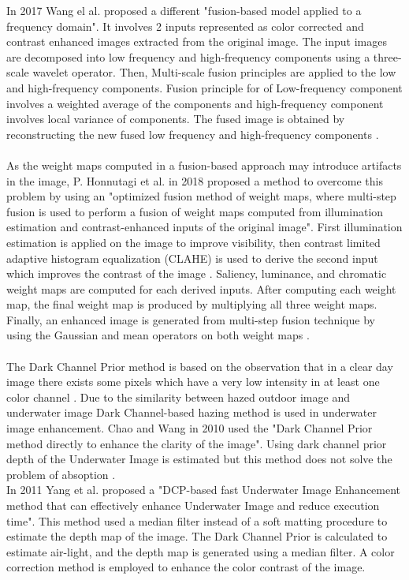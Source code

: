 \documentclass[a4paper,11pt,oneside]{article}
\begin{document}
  In 2017 Wang el al. \cite{12} proposed a different "fusion-based model applied to a frequency domain". It involves 2 inputs represented as color corrected and contrast enhanced images extracted from the original image. The input images are decomposed into low frequency and high-frequency components using a three-scale wavelet operator. Then, Multi-scale fusion principles are applied to the low and high-frequency components. Fusion principle for of Low-frequency component involves a weighted average of the components and high-frequency component involves local variance of components. The fused image is obtained by reconstructing the new fused low frequency and high-frequency components \cite{12}.\\
  \\
  As the weight maps computed in a fusion-based approach may introduce artifacts in the image, P. Honnutagi et al. in 2018 \cite{10} proposed a method to overcome this problem by using an "optimized fusion method of weight maps, where multi-step fusion is used to perform a fusion of weight maps computed from illumination estimation and contrast-enhanced inputs of the original image". First illumination estimation is applied on the image to improve visibility, then contrast limited adaptive histogram equalization (CLAHE) is used to derive the second input which improves the contrast of the image \cite{10}. Saliency, luminance, and chromatic weight maps are computed for each derived inputs. After computing each weight map, the final weight map is produced by multiplying all three weight maps. Finally, an enhanced image is generated from multi-step fusion technique by using the Gaussian and mean operators on both weight maps \cite{10}.\\
  \\
  The Dark Channel Prior method is based on the observation that in a clear day image there exists some pixels which have a very low intensity in at least one color channel \cite{15}. Due to the similarity between hazed outdoor image and underwater image Dark Channel-based hazing method is used in underwater image enhancement. Chao and Wang in 2010 \cite{25} used the "Dark Channel Prior method directly to enhance the clarity of the image". Using dark channel prior depth of the Underwater Image is estimated but this method does not solve the problem of absoption \cite{25}.\\
 In 2011 Yang et al. \cite{8} proposed a "DCP-based fast Underwater Image Enhancement method that can effectively enhance Underwater Image and reduce execution time". This method used a median filter instead of a soft matting procedure to estimate the depth map of the image. The Dark Channel Prior is calculated to estimate air-light, and the depth map is generated using a median filter. A color correction method is employed to enhance the color contrast of the image.\cite{8}\\
\end{document}
